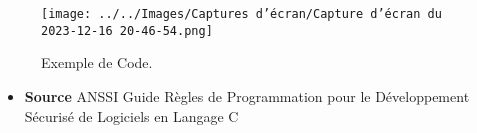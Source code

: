 \documentclass{article}
\begin{document}
\begin{figure}[h]
    \centering
\texttt{[image: ../../Images/Captures d’écran/Capture d’écran du 2023-12-16 20-46-54.png]}     
    \caption{Exemple de Code.}
    \label{fig:votre_image}
\end{figure}


\begin{itemize}
    \item \textbf{Source }ANSSI Guide Règles de Programmation pour le Développement Sécurisé de Logiciels en Langage C 
   \end{itemize}
\end{document}
